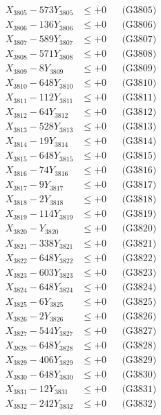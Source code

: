 \documentclass[a4paper,10pt]{article}
\begin{document}
{\begin{align}
X_{3805} - 573Y_{3805} &\leq +0 && \text{(G3805)} \\
X_{3806} - 136Y_{3806} &\leq +0 && \text{(G3806)} \\
X_{3807} - 589Y_{3807} &\leq +0 && \text{(G3807)} \\
X_{3808} - 571Y_{3808} &\leq +0 && \text{(G3808)} \\
X_{3809} - 8Y_{3809} &\leq +0 && \text{(G3809)} \\
X_{3810} - 648Y_{3810} &\leq +0 && \text{(G3810)} \\
\allowbreak
X_{3811} - 112Y_{3811} &\leq +0 && \text{(G3811)} \\
X_{3812} - 64Y_{3812} &\leq +0 && \text{(G3812)} \\
X_{3813} - 528Y_{3813} &\leq +0 && \text{(G3813)} \\
X_{3814} - 19Y_{3814} &\leq +0 && \text{(G3814)} \\
X_{3815} - 648Y_{3815} &\leq +0 && \text{(G3815)} \\
X_{3816} - 74Y_{3816} &\leq +0 && \text{(G3816)} \\
X_{3817} - 9Y_{3817} &\leq +0 && \text{(G3817)} \\
X_{3818} - 2Y_{3818} &\leq +0 && \text{(G3818)} \\
X_{3819} - 114Y_{3819} &\leq +0 && \text{(G3819)} \\
X_{3820} - Y_{3820} &\leq +0 && \text{(G3820)} \\
\allowbreak
X_{3821} - 338Y_{3821} &\leq +0 && \text{(G3821)} \\
X_{3822} - 648Y_{3822} &\leq +0 && \text{(G3822)} \\
X_{3823} - 603Y_{3823} &\leq +0 && \text{(G3823)} \\
X_{3824} - 648Y_{3824} &\leq +0 && \text{(G3824)} \\
X_{3825} - 6Y_{3825} &\leq +0 && \text{(G3825)} \\
X_{3826} - 2Y_{3826} &\leq +0 && \text{(G3826)} \\
X_{3827} - 544Y_{3827} &\leq +0 && \text{(G3827)} \\
X_{3828} - 648Y_{3828} &\leq +0 && \text{(G3828)} \\
X_{3829} - 406Y_{3829} &\leq +0 && \text{(G3829)} \\
X_{3830} - 648Y_{3830} &\leq +0 && \text{(G3830)} \\
\allowbreak
X_{3831} - 12Y_{3831} &\leq +0 && \text{(G3831)} \\
X_{3832} - 242Y_{3832} &\leq +0 && \text{(G3832)} \\

\end{align}}
\end{document}
